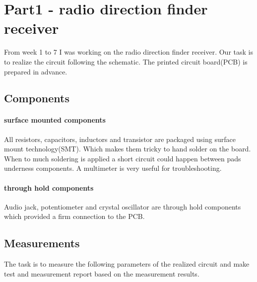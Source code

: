 \documentclass[
11pt, %
a4paper, %
oneside, %
headinclude,footinclude, %
BCOR5mm, %
]{scrartcl}
\begin{document}

\newpage %

 

\section{Part1 - radio direction finder receiver}

From week 1 to 7 I was working on the radio direction finder receiver. Our task is to realize
the circuit following the schematic. The printed circuit board(PCB) is prepared in advance.

\subsection{Components}
\paragraph{surface mounted components}
All resistors, capacitors, inductors and transistor are packaged using surface mount technology(SMT).
Which makes them tricky to hand solder on the board. When to much soldering is applied
a short circuit could happen between pads underness components. A multimeter is very useful
for troubleshooting.

\paragraph{through hold components}
Audio jack, potentiometer and crystal oscillator are through hold components which provided
a firm connection to the PCB.




\subsection{Measurements}
The task is to measure the following parameters of the realized circuit and make test and measurement report based on the measurement results.
\end{document}
